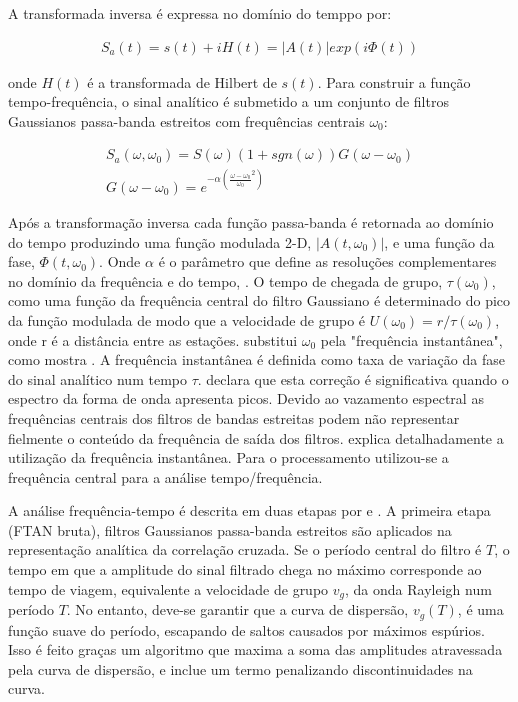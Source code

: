 A transformada inversa é expressa no domínio do temppo por:

\begin{eqnarray}
S_{a}(t) = s(t) + iH(t) = \left | A(t) \right |exp(i\Phi(t))
\end{eqnarray}

onde $H(t)$ é a transformada de Hilbert de $s(t)$. Para construir a função tempo-frequência, o sinal analítico é submetido a um conjunto de filtros Gaussianos passa-banda estreitos com frequências centrais $\omega _{0}$:

\begin{eqnarray}
S_{a}(\omega,\omega _{0}) = S(\omega)(1 + sgn(\omega))G(\omega - \omega _{0})
\\
G(\omega - \omega _{0}) = e^{-\alpha(\frac{\omega - \omega _{0}}{\omega _{0}}^{2})}
\end{eqnarray}

Após a transformação inversa cada função passa-banda é retornada ao domínio do tempo produzindo uma função modulada 2-D, $\left | A(t,\omega _{0}) \right |$, e uma função da fase, $ \Phi(t,\omega _{0}) $. Onde $\alpha$ é o parâmetro que define as resoluções complementares no domínio da frequência e do tempo, \cite{levshin_automated_2001}. O tempo de chegada de grupo, $\tau (\omega _{0})$, como uma função da frequência central do filtro Gaussiano é determinado do pico da função modulada de modo que a velocidade de grupo é $U(\omega _{0})=r/\tau (\omega _{0})$, onde r é a distância entre as estações. \cite{bensen_processing_2007} substitui $\omega _{0}$ pela "frequência instantânea", como mostra \cite{bracewell_fourier_1978}. A frequência instantânea é definida como taxa de variação da fase do sinal analítico num tempo $\tau$. \cite{bensen_processing_2007} declara que esta correção é significativa quando o espectro da forma de onda apresenta picos. Devido ao vazamento espectral as frequências centrais dos filtros de bandas estreitas podem não representar fielmente o conteúdo da frequência de saída dos filtros. \cite{boashash_estimating_1992} explica detalhadamente a utilização da frequência instantânea. Para o processamento utilizou-se a frequência central para a análise tempo/frequência.

A análise frequência-tempo é descrita em duas etapas por \cite{levshin_automated_2001} e \cite{bensen_processing_2007}. A primeira etapa (FTAN bruta), filtros Gaussianos passa-banda estreitos são aplicados na representação analítica da correlação cruzada. Se o período central do filtro é $T$, o tempo em que a amplitude do sinal filtrado chega no máximo corresponde ao tempo de viagem, equivalente a velocidade de grupo $v_{g}$, da onda Rayleigh num período $T$. No entanto, deve-se garantir que a curva de dispersão, $v_{g}(T)$, é uma função suave do período, escapando de saltos causados por máximos espúrios. Isso é feito graças um algoritmo que maxima a soma das amplitudes atravessada pela curva de dispersão, e inclue um termo penalizando discontinuidades na curva.


